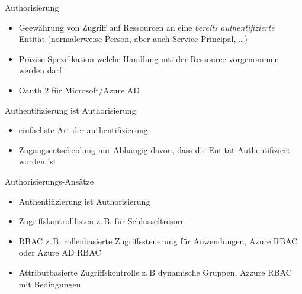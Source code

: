 

\begin{flashcard}[Definition]{Authorisierung}
  \begin{itemize}
    \item Geewährung von Zugriff auf Ressourcen an eine \emph{bereits authentifizierte} Entität\newline
    (normalerweise Person, aber auch Service Principal, \ldots)
    \item Präzise Spezifikation welche Handlung mti der Ressource vorgenommen werden darf
    \item Oauth 2 für Microsoft/Azure AD
  \end{itemize}
\end{flashcard}

\begin{flashcard}[Definition]{Authentifizierung ist Authorisierung}
  \begin{itemize}
    \item einfachste Art der authentifizierung
    \item Zugangsentscheidung nur Abhängig davon, dass die Entität Authentifiziert worden ist
  \end{itemize}
\end{flashcard}

\begin{flashcard}[Definition]{Authorisierungs-Ansätze}
  \begin{itemize}
    \item Authentifizierung ist Authorisierung
    \item Zugriffskontrolllisten\newline
      z.\,B. für Schlüsseltresore
    \item RBAC\newline
      z.\,B. rollenbasierte Zugriffssteuerung für Anwendungen, Azure RBAC oder Azure AD RBAC
    \item Attributbasierte Zugriffskontrolle\newline
      z.\,B dynamische Gruppen, Azzure RBAC mit Bedingungen
  \end{itemize}
\end{flashcard}

